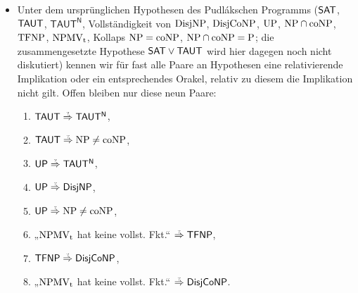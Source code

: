 \begin{itemize}[parsep=0pt,listparindent=\parindent,itemsep=5pt plus 1pt minus 1pt,midpenalty=0]
    \item Unter dem ursprünglichen Hypothesen des Pudlákschen Programms ($\mathsf{SAT}$, $ \mathsf{TAUT}$, $ \mathsf{TAUT^N}$, Vollständigkeit von $\mathrm{DisjNP}$, $ \mathrm{DisjCoNP}$, $ \mathrm{UP}$, $ \mathrm{NP}\cap\mathrm{coNP}$, $ \mathrm{TFNP}$, $ \mathrm{NPMV_t}$, Kollaps $\mathrm{NP}=\mathrm{coNP}$, $\mathrm{NP}\cap\mathrm{coNP}=\mathrm{P}$; die zusammengesetzte Hypothese $\mathsf{SAT}\lor\mathsf{TAUT}$ wird hier dagegen noch nicht diskutiert) kennen wir für fast alle Paare an Hypothesen eine relativierende Implikation oder ein entsprechendes Orakel, relativ zu diesem die Implikation nicht gilt. Offen bleiben nur diese neun Paare:
        \begin{enumerate}[noitemsep,midpenalty=0,label=(\roman*)]
            \item $\hTAUT\stackrel{\smash{\text{\raisebox{-1pt}{\tiny ?}}}}{\Rightarrow}\mathsf{TAUT^N}$,
            \item $\hTAUT\stackrel{\smash{\text{\raisebox{-1pt}{\tiny ?}}}}{\Rightarrow}\NP\neq\coNP$,
            \item $\hUP\stackrel{\smash{\text{\raisebox{-1pt}{\tiny ?}}}}{\Rightarrow}\mathsf{TAUT^N}$,
            \item $\hUP\stackrel{\smash{\text{\raisebox{-1pt}{\tiny ?}}}}{\Rightarrow}\hDisjNP$,
            \item $\hUP\stackrel{\smash{\text{\raisebox{-1pt}{\tiny ?}}}}{\Rightarrow}\NP\neq\coNP$,
            \item „$\mathrm{NPMV_t}$ hat keine vollst. Fkt.“ $\stackrel{\smash{\text{\raisebox{-1pt}{\tiny ?}}}}{\Rightarrow} \hTFNP$,
            \item $\hTFNP\stackrel{\smash{\text{\raisebox{-1pt}{\tiny ?}}}}{\Rightarrow} \hDisjCoNP$,
            \item „$\mathrm{NPMV_t}$ hat keine vollst. Fkt.“ $\stackrel{\smash{\text{\raisebox{-1pt}{\tiny ?}}}}{\Rightarrow} \hDisjCoNP$.


\end{enumerate}
\end{itemize}
